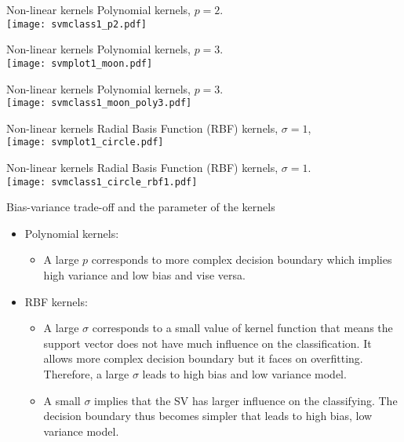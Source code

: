 \documentclass[unknownkeysallowed,10pt]{beamer}
\theoremstyle{definition} \newtheorem{rem}[thm]{Remark} \newtheorem*{rem*}{Remark}
\begin{document}
\begin{frame}[noframenumbering]{Non-linear kernels}
\vskip6pt
Polynomial kernels, $p=2$.\\
\centering
\texttt{[image: svmclass1\_p2.pdf]}
\end{frame}

\begin{frame}{Non-linear kernels}
\vskip6pt
Polynomial kernels, $p=3$.\\
\centering
\texttt{[image: svmplot1\_moon.pdf]}
\end{frame}

\begin{frame}[noframenumbering]{Non-linear kernels}
\vskip6pt
Polynomial kernels, $p=3$.\\
\centering
\texttt{[image: svmclass1\_moon\_poly3.pdf]}
\end{frame}

\begin{frame}{Non-linear kernels}
\vskip6pt
Radial Basis Function (RBF) kernels, $\sigma=1$,\\
\centering
\texttt{[image: svmplot1\_circle.pdf]}
\end{frame}

\begin{frame}[noframenumbering]{Non-linear kernels}
\vskip6pt
Radial Basis Function (RBF) kernels, $\sigma=1$.\\
\centering
\texttt{[image: svmclass1\_circle\_rbf1.pdf]}
\end{frame}

\begin{frame}{Bias-variance trade-off and the parameter of the kernels}
\begin{itemize}
	\item Polynomial kernels: 
	\begin{itemize}
		\item A large $p$ corresponds to more complex decision boundary which implies high variance and low bias and vise versa.\\
	\end{itemize}
	
	\item RBF kernels: 
	\begin{itemize}
		\item A large $\sigma$ corresponds to a small value of kernel function that means the support vector does not have much influence on the classification. It allows more complex decision boundary but it faces on overfitting. Therefore, a large $\sigma$ leads to high bias and low variance model.\\
		\item A small $\sigma$ implies that the SV has larger influence on the classifying. The decision boundary thus becomes simpler that leads to high bias, low variance model.
	\end{itemize}
		
\end{itemize}
\end{frame}
\end{document}
